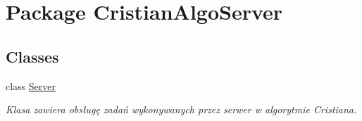 \hypertarget{namespace_cristian_algo_server}{\section{Package Cristian\+Algo\+Server}
\label{namespace_cristian_algo_server}
}
\subsection*{Classes}
\begin{DoxyCompactItemize}
\item 
class \hyperlink{class_cristian_algo_server_1_1_server}{Server}
\begin{DoxyCompactList}\small\item\em Klasa zawiera obsługę zadań wykonywanych przez serwer w algorytmie Cristiana. \end{DoxyCompactList}\end{DoxyCompactItemize}
